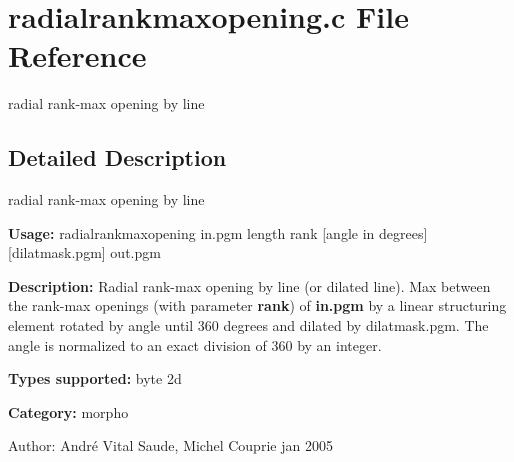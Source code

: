 \section{radialrankmaxopening.c File Reference}
\label{radialrankmaxopening_8c}
radial rank-max opening by line 



\subsection{Detailed Description}
radial rank-max opening by line 

{\bf Usage:} radialrankmaxopening in.pgm length rank [angle in degrees] [dilatmask.pgm] out.pgm

{\bf Description:} Radial rank-max opening by line (or dilated line). Max between the rank-max openings (with parameter {\bf rank}) of {\bf in.pgm} by a linear structuring element rotated by angle until 360 degrees and dilated by dilatmask.pgm. The angle is normalized to an exact division of 360 by an integer.

{\bf Types supported:} byte 2d

{\bf Category:} morpho

\begin{Desc}
\item[Author:]Andr\'{e} Vital Saude, Michel Couprie jan 2005 \end{Desc}
